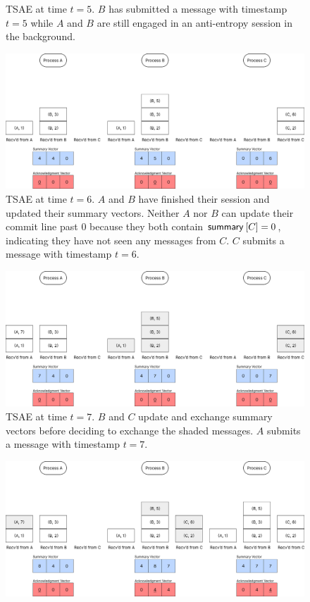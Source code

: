 \documentclass[]             %
{NASA}                       %
\theoremstyle{definition}
\begin{document}
\begin{landscape}
\begin{figure}[h]
    \caption{TSAE at time $t=5$. $B$ has submitted a message with timestamp
      $t = 5$ while $A$ and $B$ are still engaged in an anti-entropy
      session in the background.}
    \label{fig:tsae3}
  \end{figure}
  \begin{figure}[h]
    \centering
    \includegraphics[width=1.4\textwidth]{images/tsaenew/TSAE6.png}
    \caption{TSAE at time $t=6$. $A$ and $B$ have finished their session and updated their summary vectors. Neither $A$ nor $B$ can update their commit line past $0$ because they both contain $\mathsf{summary}^{}\left[C\right] = 0$, indicating they have not seen any messages from $C$. $C$ submits a message with timestamp $t = 6$.}
    \label{fig:tsae4}
  \end{figure}
  \begin{figure}[h]
    \centering
    \includegraphics[width=1.4\textwidth]{images/tsaenew/TSAE7.png}
    \caption{TSAE at time $t=7$. $B$ and $C$ update and exchange summary vectors before deciding to exchange the shaded messages. $A$ submits a message with timestamp $t = 7$.}
    \label{fig:tsae4}
  \end{figure}
  \begin{figure}[h]
    \centering
    \includegraphics[width=1.4\textwidth]{images/tsaenew/TSAE8.png}

\end{figure}
\end{landscape}
\end{document}
